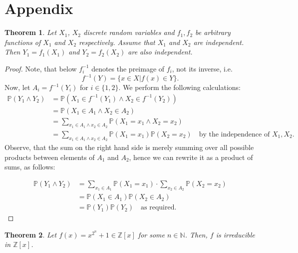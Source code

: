 \documentclass{article}
\newtheorem{theorem}{Theorem}[section]
\theoremstyle{definition}
\theoremstyle{example}
\newcommand{\Prob}{\mathbb{P}}
\newcommand{\Int}{\mathbb{Z}}
\newcommand{\Nat}{\mathbb{N}}
\begin{document}
\section*{Appendix}
\begin{theorem}
  \label{thm:func_independence}
  Let $X_1$, $X_2$ discrete random variables and $f_1, f_2$ be arbitrary
  functions of $X_1$ and $X_2$ respectively. Assume that $X_1$ and $X_2$ are
  independent. Then $Y_1 = f_1(X_1)$ and $Y_2 = f_2(X_2)$ are also independent.
\end{theorem}
\begin{proof}
  Note, that below $f^{-1}_i$ denotes the preimage of $f_i$, not its inverse,
  i.e.
  \[
    f^{-1}(Y) = \{x \in X | f(x) \in Y\}.
  \]
  Now, let $A_i = f^{-1}(Y_i)$ for $i \in \{1,2\}$. We perform the following calculations:
  \begin{align*}
    \Prob(Y_1 \land Y_2) &= \Prob(X_1 \in f^{-1}(Y_1) \land X_2 \in f^{-1}(Y_2))\\
                         &= \Prob(X_1 \in A_1 \land X_2 \in A_2) \\
                         &= \sum_{x_1 \in A_1 \land x_2 \in A_2} \Prob(X_1 = x_1 \land X_2 = x_2) \\
                         &= \sum_{x_1 \in A_1 \land x_2 \in A_2} \Prob(X_1 = x_1)\Prob(X_2 = x_2)\quad\text{by the independence of } X_1, X_2.
  \end{align*}
  Observe, that the sum on the right hand side is merely summing over all
  possible products between elements of $A_1$ and $A_2$, hence we can rewrite it
  as a product of sums, as follows:

  \begin{align*}
    \Prob(Y_1 \land Y_2) &= \sum_{x_1 \in A_1} \Prob(X_1 = x_1) \cdot \sum_{x_2 \in A_2} \Prob(X_2 = x_2) \\
                         &= \Prob(X_1 \in A_1)\Prob(X_2 \in A_2) \\
                         &= \Prob(Y_1)\Prob(Y_2)\quad\text{as required}.
  \end{align*}
\end{proof}
\begin{theorem}
  Let $f(x) = x^{2^n} + 1 \in \Int[x]$ for some $n \in \Nat$. Then, $f$ is
  irreducible in $\Int[x]$.
\end{theorem}
\end{document}

